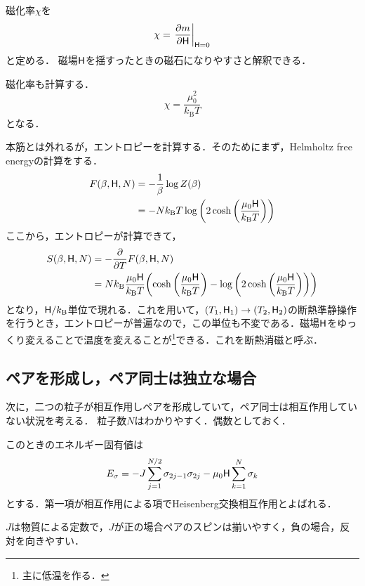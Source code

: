 	\begin{defn}[$\mf=0$での磁化率]
			磁化率$\chi$を
			\begin{equation}
					\chi = \left.\pdv{m}{\mathsf{H}}\right|_{\mathsf{H}=0}
			\end{equation}
			と定める．
			磁場$\mathsf{H}$を揺すったときの磁石になりやすさと解釈できる．
	\end{defn}

	磁化率も計算する．
	\begin{equation}
			\chi = \frac{\mu_{0}^{2}}{k_{\text{B}}T}\label{eq:single_suscep}
	\end{equation}
	となる．

	本筋とは外れるが，エントロピーを計算する．そのためにまず，Helmholtz free energyの計算をする．
	\begin{align}
			F(\beta, \mathsf{H}, N)&= -\frac{1}{\beta}\log Z(\beta)\\
							&= -Nk_{\text{B}}T\log\qty(2\cosh\qty(\frac{\mu_0\mathsf{H}}{k_{\text{B}}T}))
	\end{align}
	ここから，エントロピーが計算できて，
	\begin{align}
			S(\beta, \mathsf{H}, N) &= -\pdv{}{T}F(\beta, \mathsf{H}, N)\\
							 &= Nk_{\text{B}}\frac{\mu_0\mathsf{H}}{k_{\text{B}}T}\qty(\cosh\qty(\frac{\mu_0\mathsf{H}}{k_{\text{B}}T}) - \log \qty(2\cosh\qty(\frac{\mu_0\mathsf{H}}{k_{\text{B}}T})))
	\end{align}
	となり，$\mathsf{H}/k_{\text{B}}$単位で現れる．これを用いて，$(T_1, \mathsf{H}_1)\rightarrow(T_2, \mathsf{H}_2)$の断熱準静操作を行うとき，エントロピーが普遍なので，この単位も不変である．磁場$\mathsf{H}$をゆっくり変えることで温度を変えることが\footnote{主に低温を作る．}できる．これを断熱消磁と呼ぶ．

	\subsection{ペアを形成し，ペア同士は独立な場合}
	次に，二つの粒子が相互作用しペアを形成していて，ペア同士は相互作用していない状況を考える．
	粒子数$N$はわかりやすく．偶数としておく．

	このときのエネルギー固有値は
	\begin{equation}
			E_{\sigma} = -J\sum_{j = 1}^{N/2}\sigma_{2j-1}\sigma_{2j} - \mu_0 \mathsf{H} \sum_{k=1}^{N}\sigma_k\label{eq:exchange}
	\end{equation}
	とする．第一項が相互作用による項でHeisenberg交換相互作用とよばれる．

	$J$は物質による定数で，$J$が正の場合ペアのスピンは揃いやすく，負の場合，反対を向きやすい．

